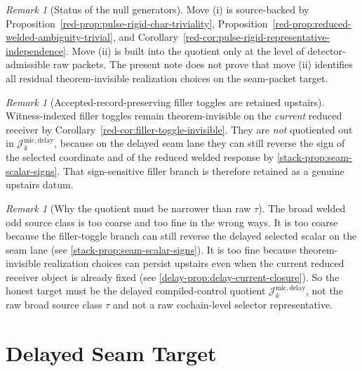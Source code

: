 \documentclass[11pt]{article}
\theoremstyle{definition}
\theoremstyle{plain}
\theoremstyle{remark}
\newtheorem{remark}[definition]{Remark}
\begin{document}
\begin{remark}[Status of the null generators]
\label{rem:micro-delay-generators-status}
Move \textnormal{(i)} is source-backed by
Proposition~\ref*{red-prop:pulse-rigid-char-triviality},
Proposition~\ref*{red-prop:reduced-welded-ambiguity-trivial}, and
Corollary~\ref*{red-cor:pulse-rigid-representative-independence}.
Move \textnormal{(ii)} is built into the quotient only at the level of detector-admissible raw
packets.
The present note does not prove that move \textnormal{(ii)} identifies all residual
theorem-invisible realization choices on the seam-packet target.
\end{remark}

\begin{remark}[Accepted-record-preserving filler toggles are retained upstairs]
\label{rem:micro-delay-filler-retained}
Witness-indexed filler toggles remain theorem-invisible on the \emph{current} reduced receiver by
Corollary~\ref*{red-cor:filler-toggle-invisible}.
They are \emph{not} quotiented out in
\(
\mathcal J^{\mathrm{mic,delay}}_k
\),
because on the delayed seam lane they can still reverse the sign of the selected coordinate and of
the reduced welded response by \cref{stack-prop:seam-scalar-signs}.
That sign-sensitive filler branch is therefore retained as a genuine upstairs datum.
\end{remark}

\begin{remark}[Why the quotient must be narrower than raw \(\tau\)]
\label{rem:micro-delay-why}
The broad welded odd source class is too coarse and too fine in the wrong ways.
It is too coarse because the filler-toggle branch can still reverse the delayed selected scalar on
the seam lane \textup{(see \cref{stack-prop:seam-scalar-signs})}.
It is too fine because theorem-invisible realization choices can persist upstairs even when the
current reduced receiver object is already fixed \textup{(see \cref{delay-prop:delay-current-closure})}.
So the honest target must be the delayed compiled-control quotient
\(\mathcal J^{\mathrm{mic,delay}}_k\), not the raw broad source class \(\tau\) and not a raw
cochain-level selector representative.
\end{remark}

\section{Delayed Seam Target}
\end{document}
